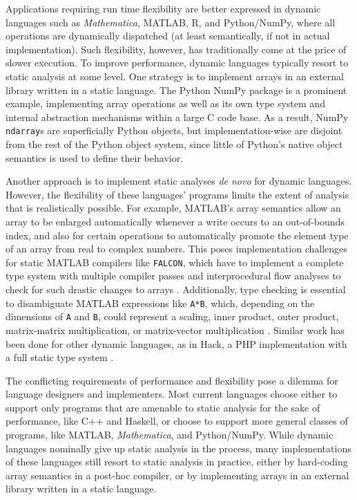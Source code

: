 \documentclass[preprint]{sigplanconf}
\newcommand{\MATLAB}{\textsc{MATLAB}}
\newcommand{\Mathematica}{\textit{Mathematica}}
\newcommand{\code}[1]{\texttt{#1}}
\begin{document}
Applications requiring run time flexibility are better expressed in
dynamic languages such as \Mathematica, \MATLAB, R, and Python/NumPy, where
all operations are dynamically dispatched (at least semantically, if not
in actual implementation). Such flexibility,
however, has traditionally come at the price of slower execution.
To improve performance, dynamic languages typically resort to static analysis
at some level.
One strategy is to implement arrays in an external library
written in a static language.
The Python NumPy package is a prominent example, implementing array operations
as well as its own type system and internal abstraction mechanisms within
a large C code base. As a result, NumPy \code{ndarray}s are
superficially Python objects, but implementation-wise are disjoint from the
rest of the Python object system, since little of Python's native object
semantics is used to define their behavior.

Another approach is to implement static analyses
\textit{de novo} for dynamic languages. However, the flexibility
of these languages' programs limits the extent of analysis that is
realistically possible. For example, \MATLAB's array
semantics allow an array to be enlarged automatically whenever a write occurs
to an out-of-bounds index, and also for certain operations to
automatically promote the element type of an array from real to complex
numbers. This poses implementation challenges for static \MATLAB{} compilers
like \code{FALCON}, which have to implement a complete type system with
multiple compiler passes and interprocedural flow analyses to check
for such drastic changes to arrays \cite{Rose:1999tt,
Li:2013mf}. Additionally, type checking is essential to disambiguate
\MATLAB{} expressions like \code{A*B}, which, depending on the dimensions of
\code{A} and \code{B}, could represent a scaling, inner product, outer
product, matrix-matrix multiplication, or matrix-vector multiplication
\cite{Rose:1999tt}. Similar work has been done for other dynamic languages,
as in Hack, a PHP implementation with a full static type system
\cite{Verlaguet:2014hn}.


The conflicting requirements of performance and flexibility pose a dilemma for
language designers and implementers. Most current languages choose either to
support only programs that are amenable to static analysis for the sake of
performance, like C++ and Haskell, or choose to support more general
classes of programs, like \MATLAB, \Mathematica, and Python/NumPy. While
dynamic languages nominally give up static analysis in the process, many
implementations of these languages still resort to static analysis in
practice, either by hard-coding array semantics in a post-hoc compiler, or by
implementing arrays in an external library written in a static language.
\end{document}
